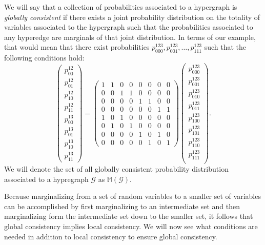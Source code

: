 We will say that a collection of probabilities associated to a
hypergraph is \emph{globally consistent} if there exists a joint
probability distribution on the totality of variables associated to
the hypergraph such that the probabilities associated to any hyperedge
are marginals of that joint distribution.  In terms of our example,
that would mean that there exist probabilities $p^{123}_{000},
p^{123}_{001}, \ldots, p^{123}_{111}$ such that the following
conditions hold:
\begin{equation}
 \begin{pmatrix}
  p^{12}_{00}\\
  p^{12}_{01}\\
  p^{12}_{10}\\
  p^{12}_{11}\\
  p^{13}_{00}\\
  p^{13}_{01}\\
  p^{13}_{10}\\
  p^{13}_{11}
 \end{pmatrix} =
 \begin{pmatrix}
  1 & 1 & 0 & 0 & 0 & 0 & 0 & 0\\
  0 & 0 & 1 & 1 & 0 & 0 & 0 & 0\\
  0 & 0 & 0 & 0 & 1 & 1 & 0 & 0\\
  0 & 0 & 0 & 0 & 0 & 0 & 1 & 1\\
  1 & 0 & 1 & 0 & 0 & 0 & 0 & 0\\
  0 & 1 & 0 & 1 & 0 & 0 & 0 & 0\\
  0 & 0 & 0 & 0 & 1 & 0 & 1 & 0\\
  0 & 0 & 0 & 0 & 0 & 1 & 0 & 1
 \end{pmatrix}
 \begin{pmatrix}
  p^{123}_{000}\\
  p^{123}_{001}\\
  p^{123}_{010}\\
  p^{123}_{011}\\
  p^{123}_{100}\\
  p^{123}_{101}\\
  p^{123}_{110}\\
  p^{123}_{111}\\
 \end{pmatrix}.
\end{equation}
We will denote the set of all globally consistent probability
distribution associated to a hypregraph $\mathcal{G}$ as
$\mathbb{M}(\mathcal{G})$.

Because marginalizing from a set of random variables to a smaller set
of variables can be accomplished by first marginalizing to an
intermediate set and then marginalizing form the intermediate set down
to the smaller set, it follows that global consistency implies local
consistency.  We will now see what conditions are needed in
addition to local consistency to ensure global consistency.

